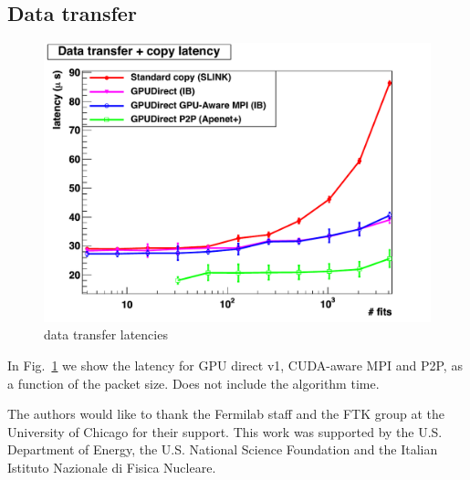 \documentclass[letterpaper]{jpconf}
\begin{document}
\subsection{Data transfer}
\begin{figure}[tbp]
  \centering
  \includegraphics[width=0.9\linewidth]{../../2012/figures/DT_MC_SLINK_IB_APE_low}
  \caption{data transfer latencies}
  \label{fig:xferlatency}
\end{figure}
In Fig.~\ref{fig:xferlatency} we show the latency for GPU direct v1,
CUDA-aware MPI and P2P, as a function of the packet size. Does not
include the algorithm time.


\ack
The authors would like to thank the Fermilab staff and the FTK group at the 
University of Chicago for their support. This work was supported by the
U.S. Department of Energy, the U.S. National Science Foundation and the Italian
Istituto Nazionale di Fisica Nucleare. 






 
\end{document}
